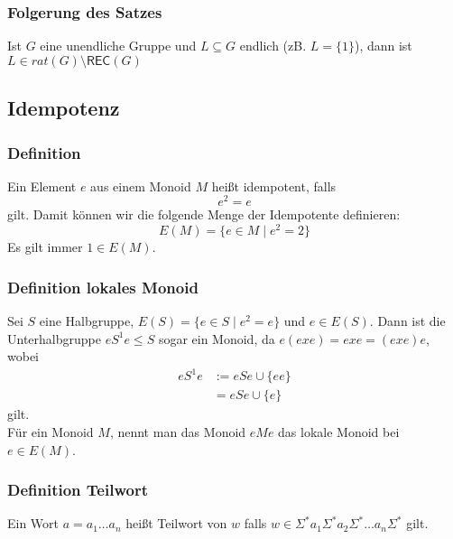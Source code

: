 \documentclass[12pt, german]{article}
\newcommand{\sigstern}{\Sigma^\ast}
\newcommand{\rec}{\mathsf{REC}}
\begin{document}
	\subsubsection{Folgerung des Satzes}	
	Ist $G$ eine unendliche Gruppe und $L \subseteq G$ endlich (zB. $L = \{1\}$), dann ist $L \in rat(G) \setminus \rec(G)$
	
	\subsection{Idempotenz}
	\subsubsection{Definition}
	Ein Element $e$ aus einem Monoid $M$ hei\ss t idempotent, falls $$e^2 = e$$gilt.
	Damit können wir die folgende Menge der Idempotente definieren: $$E(M) = \{ e \in M \mid e^2 = 2\}$$ Es gilt immer $1\in E(M)$.
	
	\subsubsection{Definition lokales Monoid}
	Sei $S$ eine Halbgruppe, $E(S) = \{e \in S \mid e^2 = e\}$ und $e \in E(S)$. Dann ist die Unterhalbgruppe $eS^1e \leq S$ sogar ein Monoid, da 	$e(exe) = exe = (exe)e$, wobei 
	\begin{align*}
		eS^1e &:= eSe \cup \{ee\} \\
		&=eSe \cup \{e\}
	\end{align*}
	gilt.\\
	Für ein Monoid $M$, nennt man das Monoid $eMe$ das lokale Monoid bei $e \in E(M)$.
	
	\subsubsection{Definition Teilwort}
	Ein Wort $a = a_1 \ldots a_n$ hei\ss t Teilwort von $w$ falls $w \in \sigstern a_1 \sigstern a_2 \sigstern \ldots a_n\sigstern$ gilt.
	
\end{document}
